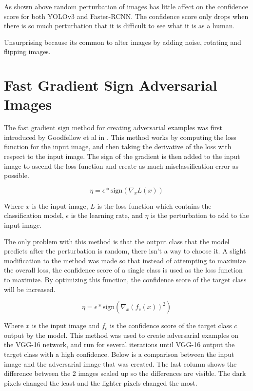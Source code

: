 \documentclass{article}
\begin{document}
As shown above random perturbation of images has little affect on the confidence score for both YOLOv3 and Faster-RCNN. The confidence score only drops when there is so much perturbation that it is difficult to see what it is as a human.

Unsurprising because its common to alter images by adding noise, rotating and flipping images.

\section{Fast Gradient Sign Adversarial Images}

The fast gradient sign method for creating adversarial examples was first introduced by Goodfellow et al in \cite{goodfellow2015explaining}. This method works by computing the loss function for the input image, and then taking the derivative of the loss with respect to the input image. The sign of the gradient is then added to the input image to ascend the loss function and create as much misclassification error as possible.

\begin{equation}
    \eta = \epsilon * \text{sign} (\nabla_x L(x))
\end{equation}

Where $x$ is the input image, $L$ is the loss function which contains the classification model, $\epsilon$ is the learning rate, and $\eta$ is the perturbation to add to the input image.

The only problem with this method is that the output class that the model predicts after the perturbation is random, there isn't a way to choose it. A slight modification to the method was made so that instead of attempting to maximize the overall loss, the confidence score of a single class is used as the loss function to maximize. By optimizing this function, the confidence score of the target class will be increased.

\begin{equation}
    \eta = \epsilon * \text{sign} (\nabla_x (f_c(x))^2)
\end{equation}

Where $x$ is the input image and $f_c$ is the confidence score of the target class $c$ output by the model. This method was used to create adversarial examples on the VGG-16 \cite{simonyan2015deep} network, and run for several iterations until VGG-16 output the target class with a high confidence. Below is a comparison between the input image and the adversarial image that was created. The last column shows the difference between the 2 images scaled up so the differences are visible. The dark pixels changed the least and the lighter pixels changed the most.
\end{document}
